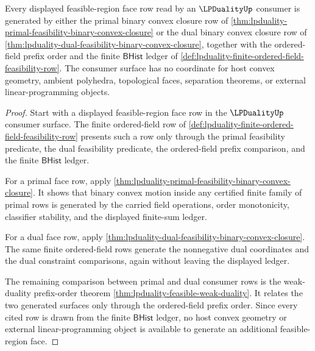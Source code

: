 \begin{theorem}
\label{thm:lpduality-feasible-region-face-exhaustion}
Every displayed feasible-region face row read by an $\LPDualityUp$ consumer is
generated by either the primal binary convex closure row of
\autoref{thm:lpduality-primal-feasibility-binary-convex-closure} or the dual
binary convex closure row of
\autoref{thm:lpduality-dual-feasibility-binary-convex-closure}, together with
the ordered-field prefix order and the finite $\mathsf{BHist}$ ledger of
\autoref{def:lpduality-finite-ordered-field-feasibility-row}. The consumer
surface has no coordinate for host convex geometry, ambient polyhedra,
topological faces, separation theorems, or external linear-programming
objects.
\end{theorem}
\begin{proof}
Start with a displayed feasible-region face row in the $\LPDualityUp$ consumer
surface. The finite ordered-field row of
\autoref{def:lpduality-finite-ordered-field-feasibility-row} presents such a
row only through the primal feasibility predicate, the dual feasibility
predicate, the ordered-field prefix comparison, and the finite
$\mathsf{BHist}$ ledger.

For a primal face row, apply
\autoref{thm:lpduality-primal-feasibility-binary-convex-closure}. It shows
that binary convex motion inside any certified finite family of primal rows is
generated by the carried field operations, order monotonicity, classifier
stability, and the displayed finite-sum ledger.

For a dual face row, apply
\autoref{thm:lpduality-dual-feasibility-binary-convex-closure}. The same
finite ordered-field rows generate the nonnegative dual coordinates and the
dual constraint comparisons, again without leaving the displayed ledger.

The remaining comparison between primal and dual consumer rows is the
weak-duality prefix-order theorem
\autoref{thm:lpduality-feasible-weak-duality}. It relates the two generated
surfaces only through the ordered-field prefix order. Since every cited row is
drawn from the finite $\mathsf{BHist}$ ledger, no host convex geometry or
external linear-programming object is available to generate an additional
feasible-region face.
\end{proof}

